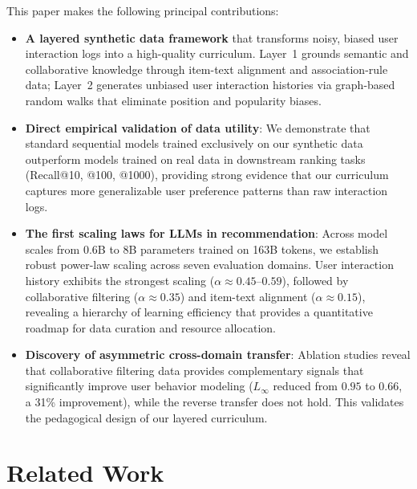 \documentclass[]{fairmeta}
\newcommand{\jh}[1]{\iftoggle{comment}{\textcolor{orange}{[JH: #1]}}{}}
\begin{document}
This paper makes the following principal contributions:
  \begin{itemize}
      \item \textbf{A layered synthetic data framework} that transforms noisy, biased user interaction logs into a high-quality curriculum. Layer~1 grounds semantic and collaborative knowledge through item-text alignment and association-rule data; Layer~2 generates unbiased user interaction histories via graph-based random walks that eliminate position and popularity biases.

      \item \textbf{Direct empirical validation of data utility}: We demonstrate that standard sequential models trained exclusively on our synthetic data outperform models trained on real data in downstream ranking tasks (Recall@10, @100, @1000), providing strong evidence that our curriculum captures more generalizable user preference patterns than raw interaction logs.

      \item \textbf{The first scaling laws for LLMs in recommendation}: Across model scales from 0.6B to 8B parameters trained on 163B tokens, we establish robust power-law scaling across seven evaluation domains. User interaction history exhibits the strongest scaling ($\alpha \approx 0.45$--$0.59$), followed by collaborative filtering ($\alpha \approx 0.35$) and item-text alignment ($\alpha \approx 0.15$), revealing a hierarchy of learning efficiency that provides a quantitative roadmap for data curation and resource allocation.
      \item \textbf{Discovery of asymmetric cross-domain transfer}: Ablation studies reveal that collaborative filtering data provides complementary signals that significantly improve user behavior modeling ($L_\infty$ reduced from $0.95$ to $0.66$, a 31\% improvement), while the reverse transfer does not hold. This validates the pedagogical design of our layered curriculum.
  \end{itemize}
\section{Related Work}
\end{document}
